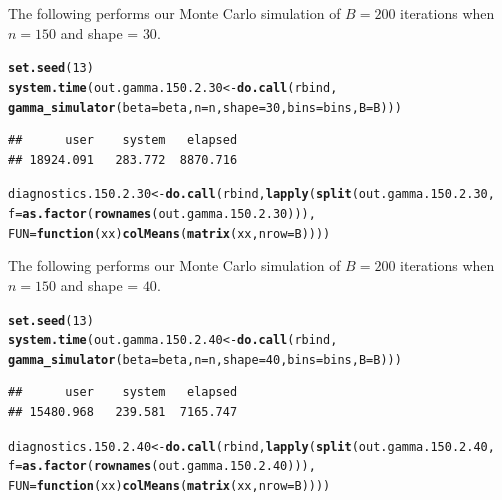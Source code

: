 \documentclass[11pt]{article}\usepackage[]{graphicx}\usepackage[]{color}
\makeatletter
\newcommand{\hlnum}[1]{\textcolor[rgb]{0.686,0.059,0.569}{#1}}%
\newcommand{\hlstd}[1]{\textcolor[rgb]{0.345,0.345,0.345}{#1}}%
\newcommand{\hlkwa}[1]{\textcolor[rgb]{0.161,0.373,0.58}{\textbf{#1}}}%
\newcommand{\hlkwb}[1]{\textcolor[rgb]{0.69,0.353,0.396}{#1}}%
\newcommand{\hlkwc}[1]{\textcolor[rgb]{0.333,0.667,0.333}{#1}}%
\newcommand{\hlkwd}[1]{\textcolor[rgb]{0.737,0.353,0.396}{\textbf{#1}}}%
\newenvironment{kframe}{%
 \def\at@end@of@kframe{}%
 \ifinner\ifhmode%
  \def\at@end@of@kframe{\end{minipage}}%
  \begin{minipage}{\columnwidth}%
 \fi\fi%
 \def\FrameCommand##1{\hskip\@totalleftmargin \hskip-\fboxsep
 \colorbox{shadecolor}{##1}\hskip-\fboxsep
     \hskip-\linewidth \hskip-\@totalleftmargin \hskip\columnwidth}%
 \MakeFramed {\advance\hsize-\width
   \@totalleftmargin\z@ \linewidth\hsize
   \@setminipage}}%
 {\par\unskip\endMakeFramed%
 \at@end@of@kframe}
\newenvironment{knitrout}{}{} %
\makeatother
\begin{document}
The following performs our Monte Carlo simulation of $B = 200$ iterations 
when $n = 150$ and shape = $30$.

\begin{knitrout}
\color{fgcolor}\begin{kframe}
\begin{alltt}
\hlkwd{set.seed}\hlstd{(}\hlnum{13}\hlstd{)}
\hlkwd{system.time}\hlstd{(out.gamma.150.2.30} \hlkwb{<-} \hlkwd{do.call}\hlstd{(rbind,}
  \hlkwd{gamma_simulator}\hlstd{(}\hlkwc{beta} \hlstd{= beta,} \hlkwc{n} \hlstd{= n,} \hlkwc{shape} \hlstd{=} \hlnum{30}\hlstd{,} \hlkwc{bins} \hlstd{= bins,} \hlkwc{B} \hlstd{= B)))}
\end{alltt}
\begin{verbatim}
##      user    system   elapsed 
## 18924.091   283.772  8870.716
\end{verbatim}
\begin{alltt}
\hlstd{diagnostics.150.2.30} \hlkwb{<-} \hlkwd{do.call}\hlstd{(rbind,} \hlkwd{lapply}\hlstd{(}\hlkwd{split}\hlstd{(out.gamma.150.2.30,}
  \hlkwc{f} \hlstd{=} \hlkwd{as.factor}\hlstd{(}\hlkwd{rownames}\hlstd{(out.gamma.150.2.30))),}
  \hlkwc{FUN} \hlstd{=} \hlkwa{function}\hlstd{(}\hlkwc{xx}\hlstd{)} \hlkwd{colMeans}\hlstd{(}\hlkwd{matrix}\hlstd{(xx,} \hlkwc{nrow} \hlstd{= B))))}
\end{alltt}
\end{kframe}
\end{knitrout}




The following performs our Monte Carlo simulation of $B = 200$ iterations 
when $n = 150$ and shape = $40$.

\begin{knitrout}
\color{fgcolor}\begin{kframe}
\begin{alltt}
\hlkwd{set.seed}\hlstd{(}\hlnum{13}\hlstd{)}
\hlkwd{system.time}\hlstd{(out.gamma.150.2.40} \hlkwb{<-} \hlkwd{do.call}\hlstd{(rbind,}
  \hlkwd{gamma_simulator}\hlstd{(}\hlkwc{beta} \hlstd{= beta,} \hlkwc{n} \hlstd{= n,} \hlkwc{shape} \hlstd{=} \hlnum{40}\hlstd{,} \hlkwc{bins} \hlstd{= bins,} \hlkwc{B} \hlstd{= B)))}
\end{alltt}
\begin{verbatim}
##      user    system   elapsed 
## 15480.968   239.581  7165.747
\end{verbatim}
\begin{alltt}
\hlstd{diagnostics.150.2.40} \hlkwb{<-} \hlkwd{do.call}\hlstd{(rbind,} \hlkwd{lapply}\hlstd{(}\hlkwd{split}\hlstd{(out.gamma.150.2.40,}
  \hlkwc{f} \hlstd{=} \hlkwd{as.factor}\hlstd{(}\hlkwd{rownames}\hlstd{(out.gamma.150.2.40))),}
  \hlkwc{FUN} \hlstd{=} \hlkwa{function}\hlstd{(}\hlkwc{xx}\hlstd{)} \hlkwd{colMeans}\hlstd{(}\hlkwd{matrix}\hlstd{(xx,} \hlkwc{nrow} \hlstd{= B))))}
\end{alltt}
\end{kframe}
\end{knitrout}
\end{document}

